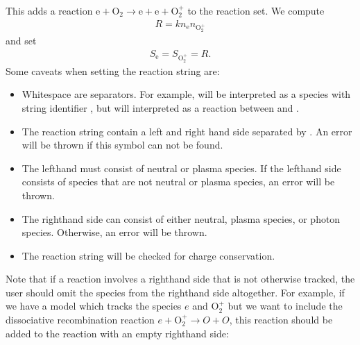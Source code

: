 \documentclass[letterpaper,10pt,english]{sphinxmanual}
\begin{document}
This adds a reaction \(\textrm{e} + \textrm{O}_2 \rightarrow \textrm{e} + \textrm{e} + \textrm{O}_2^+\) to the reaction set.
We compute
\begin{equation*}
\begin{split}R = kn_{\textrm{e}}n_{\textrm{O}_2^+}\end{split}
\end{equation*}
and set
\begin{equation*}
\begin{split}S_{\textrm{e}} = S_{\textrm{O}_2^+} = R.\end{split}
\end{equation*}
Some caveats when setting the reaction string are:
\begin{itemize}
\item {} 
Whitespace are separators.
For example,  will be interpreted as a species with string identifier , but  will interpreted as a reaction between  and .

\item {} 
The reaction string  contain a left and right hand side separated by \sphinxcode{\sphinxupquote{\sphinxhyphen{}\textgreater{}}}.
An error will be thrown if this symbol can not be found.

\item {} 
The left\sphinxhyphen{}hand must consist  of neutral or plasma species.
If the left\sphinxhyphen{}hand side consists of species that are not neutral or plasma species, an error will be thrown.

\item {} 
The right\sphinxhyphen{}hand side can consist of either neutral, plasma species, or photon species.
Otherwise, an error will be thrown.

\item {} 
The reaction string will be checked for charge conservation.

\end{itemize}

Note that if a reaction involves a right\sphinxhyphen{}hand side that is not otherwise tracked, the user should omit the species from the right\sphinxhyphen{}hand side altogether.
For example, if we have a model which tracks the species \(e\) and \(\textrm{O}_2^+\) but we want to include the dissociative recombination reaction \(e + \textrm{O}_2^+ \rightarrow O + O\), this reaction should be added to the reaction with an empty right\sphinxhyphen{}hand side:
\end{document}
